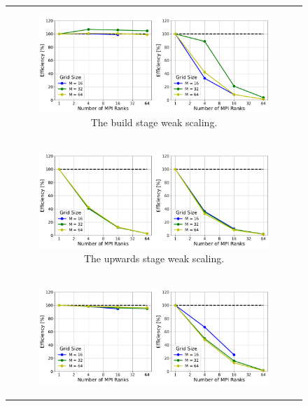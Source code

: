 \begin{figure}
    \centering
    \begin{tabular}{c}
        \begin{subfigure}[t]{0.95\textwidth}
            \centering
            \includegraphics[width=\textwidth]{figures/build-weak-scaling-timing-no-title.pdf}
            \caption{The build stage weak scaling.}
            \label{subfig:weak_build}
        \end{subfigure}
        \\
        \begin{subfigure}[t]{0.95\textwidth}
            \centering
            \includegraphics[width=\textwidth]{figures/upwards-weak-scaling-timing-no-title.pdf}
            \caption{The upwards stage weak scaling.}
            \label{subfig:weak_upwards}    
        \end{subfigure}
        \\
        \begin{subfigure}[t]{0.95\textwidth}
            \centering
            \includegraphics[width=\textwidth]{figures/solve-weak-scaling-timing-no-title.pdf}

\end{subfigure}
\end{tabular}
\end{figure}
